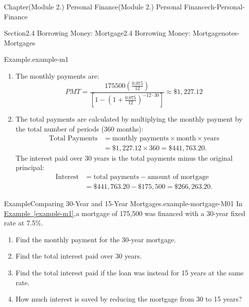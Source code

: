 \documentclass[oneside,10pt,]{book}
\newcommand{\xreffont}{\relax}
\newcommand{\amp}{&}
\begin{document}
\begin{chapterptx}{Chapter}{(Module 2.) Personal Finance}{}{(Module 2.) Personal Finance}{}{}{ch-Personal-Finance}
\begin{sectionptx}{Section}{2.4 Borrowing Money: Mortgage}{}{2.4 Borrowing Money: Mortgage}{}{}{notes-Mortgages}
\begin{example}{Example}{.}{example-m1}
\begin{enumerate}
\begin{aside}{Aside}{Computing Monthly Mortgage Payments.}{example-m1-3-1-3-2}%
The monthly mortgage payment, \(PMT\), required to repay a loan of \(P\) dollars paid \(n\) times per year over \(t\) years at an annual rate \(r\) is:%
\begin{equation*}
PMT = \frac{P\left(\frac{r}{n}\right)}{\left[1-\left(1+\frac{r}{n}\right)^{-nt}\right]}
\end{equation*}
%
\end{aside}
\item{}The monthly payments are:%
\begin{equation*}
PMT = \frac{175500\left(\frac{0.075}{12}\right)}{\left[1-\left(1+\frac{0.075}{12}\right)^{-12 \cdot 30}\right]} \approx \$1,227.12
\end{equation*}
%
\item{}The total payments are calculated by multiplying the monthly payment by the total number of periods (360 months):%
\begin{align*}
\text{Total Payments} \amp = \text{monthly payments} \times \text{month} \times \text{years}\\
\amp =\$1,227.12 \times 360 = \$441,763.20.
\end{align*}
The interest paid over 30 years is the total payments minus the original principal:%
\begin{align*}
\text{Interest} \amp = \text{total payments} - \text{amount of mortgage} \\
\amp = \$441,763.20 - \$175,500 = \$266,263.20.
\end{align*}
%
\end{enumerate}
\end{example}
\begin{example}{Example}{Comparing 30-Year and 15-Year Mortgages.}{example-mortgage-M01}%
In \hyperref[example-m1]{Example~{\xreffont\ref{example-m1}}},a mortgage of \textdollar{}175,500 was financed with a 30-year fixed rate at 7.5\%.%
%
\begin{enumerate}
\item{}Find the monthly payment for the 30-year mortgage.%
\item{}Find the total interest paid over 30 years.%
\item{}Find the total interest paid if the loan was instead for 15 years at the same rate.%
\item{}How much interest is saved by reducing the mortgage from 30 to 15 years?%
\end{enumerate}

\end{example}
\end{sectionptx}
\end{chapterptx}
\end{document}
